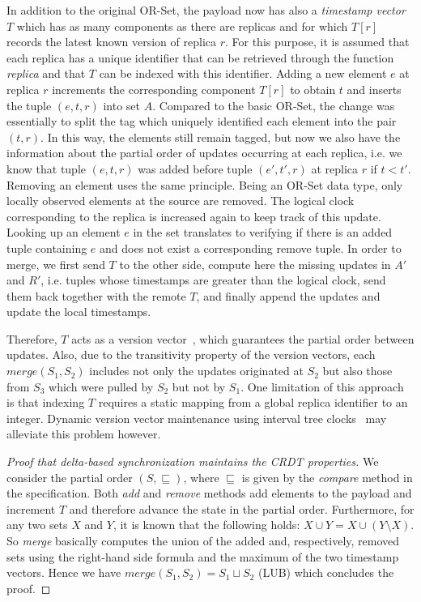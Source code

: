 In addition to the original OR-Set, the payload now has also a \textit{timestamp
vector} $T$ which has as many components as there are replicas and for which
$T[r]$ records the latest known version of replica $r$. For this purpose, it is
assumed that each replica has a unique identifier that can be retrieved through
the function \textit{replica} and that $T$ can be indexed with this identifier.
Adding a new element $e$ at replica $r$ increments the corresponding component
$T[r]$ to obtain $t$ and inserts the tuple $(e, t, r)$ into set $A$. Compared to
the basic OR-Set, the change was essentially to split the tag which uniquely
identified each element into the pair $(t, r)$. In this way, the elements still
remain tagged, but now we also have the information about the partial order of
updates occurring at each replica, i.e. we know that tuple $(e, t, r)$ was added
before tuple $(e', t', r)$ at replica $r$ if $t < t'$. Removing an element uses
the same principle. Being an OR-Set data type, only locally observed elements at
the source are removed. The logical clock corresponding to the replica is
increased again to keep track of this update. Looking up an element $e$ in the
set translates to verifying if there is an added tuple containing $e$ and does
not exist a corresponding remove tuple. In order to merge, we first send $T$ to
the other side, compute here the missing updates in $A'$ and $R'$, i.e. tuples
whose timestamps are greater than the logical clock, send them back together
with the remote $T$, and finally append the updates and update the local
timestamps. 

Therefore, $T$ acts as a version vector~\cite{Parker:1983:DMI:1313337.1313753},
which guarantees the partial order between updates. Also, due to the
transitivity property of the version vectors, each $\textit{merge}(S_{1},
S_{2})$ includes not only the updates originated at $S_{2}$ but also those from
$S_{3}$ which were pulled by $S_{2}$ but not by $S_{1}$. One limitation of this
approach is that indexing $T$ requires a static mapping from a global replica
identifier to an integer. Dynamic version vector maintenance using interval tree
clocks~\cite{Almeida:2008:ITC:1496310.1496330} may alleviate this problem
however.

\begin{proof}[Proof that delta-based synchronization maintains the CRDT
properties] 
We consider the partial order $(S, \sqsubseteq)$, where $\sqsubseteq$ is given
by the \textit{compare} method in the specification. Both \textit{add} and
\textit{remove} methods add elements to the payload and increment $T$ and
therefore advance the state in the partial order. Furthermore, for any two sets
$X$ and $Y$, it is known that the following holds: $X \cup Y = X \cup (Y
\setminus X)$. So \textit{merge} basically computes the union of the added and,
respectively, removed sets using the right-hand side formula and the maximum of
the two timestamp vectors. Hence we have $\textit{merge}(S_{1}, S_{2}) = S_{1}
\sqcup S_{2}$ (LUB) which concludes the proof.
\end{proof}